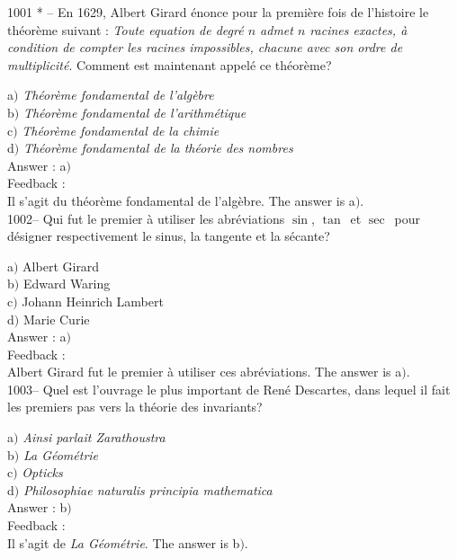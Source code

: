 ﻿\documentclass[letterpaper, 12pt]{article}
\begin{document}
1001 * -- En 1629, Albert Girard \'enonce pour la premi\`ere fois de
l'histoire le th\'eor\`eme suivant : {\sl Toute equation de
degr\'e $n$ admet $n$ racines exactes, \`a condition de compter les
racines impossibles, chacune avec son ordre de multiplicit\'e}.
Comment est maintenant appel\'e ce th\'eor\`eme?

a$)$ {\sl Th\'eor\`eme fondamental de l'alg\`ebre} \\
b$)$ {\sl Th\'eor\`eme fondamental de l'arithm\'etique} \\
c$)$ {\sl Th\'eor\`eme fondamental de la chimie} \\
d$)$ {\sl Th\'eor\`eme fondamental de la th\'eorie des nombres}\\

Answer : a$)$\\

Feedback : \\
Il s'agit du th\'eor\`eme fondamental de l'alg\`ebre.
The answer is a$)$.\\

1002-- Qui fut le premier \`a utiliser les abr\'eviations
\og$\sin$\fg, \og$\tan$\fg\ et \og$\sec$\fg\ pour d\'esigner
respectivement le sinus, la tangente et la s\'ecante?

a$)$ Albert Girard \\
b$)$ Edward Waring \\
c$)$ Johann Heinrich Lambert \\
d$)$ Marie Curie\\

Answer : a$)$\\

Feedback : \\
Albert Girard fut le premier \`a utiliser ces abr\'eviations.
The answer is a$)$.\\

1003-- Quel est l'ouvrage le plus important de Ren\'e Descartes,
dans lequel il fait les premiers pas vers la th\'eorie des
invariants?

a$)$ {\sl Ainsi parlait Zarathoustra} \\
b$)$ {\sl La G\'eom\'etrie} \\
c$)$ {\sl Opticks} \\
d$)$ {\sl Philosophiae naturalis principia mathematica}\\

Answer : b$)$\\

Feedback : \\
Il s'agit de {\sl La G\'eom\'etrie}.
The answer is b$)$.\\
\end{document}
